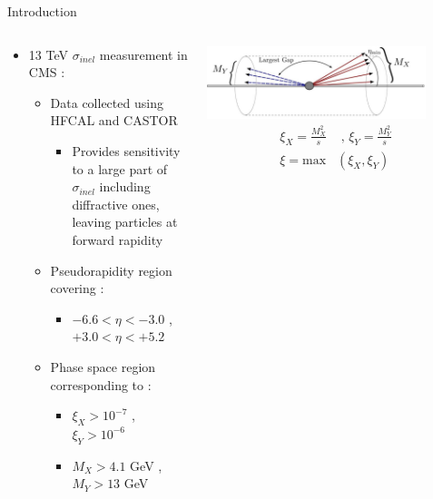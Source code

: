 \documentclass[aspectratio=169,xcolor=dvipsnames]{beamer}
\begin{document}
\begin{frame}{Introduction}
	\begin{columns}[T]
		\begin{column}{0.6\textwidth}
			\begin{itemize}
				\item 13 TeV $\sigma_{inel}$ measurement in CMS :
				\begin{itemize}
					\item Data collected using HFCAL and CASTOR
					\begin{itemize}
						\item Provides sensitivity to a large part of $\sigma_{inel}$ including diffractive ones, leaving particles at forward rapidity
					\end{itemize}
					\item Pseudorapidity region covering :
					\begin{itemize}
						\item $-6.6 < \eta < -3.0$ , $+3.0 < \eta < +5.2$
					\end{itemize}
					\item Phase space region corresponding to :
					\begin{itemize}
						\item $\xi_X > 10^{-7}$ , $\xi_Y > 10^{-6}$
						\item $M_X > 4.1$ GeV , $M_Y > 13$ GeV
					\end{itemize}
				\end{itemize}
			\end{itemize}
		\end{column}
		\begin{column}{.4\textwidth}
			\centering
			\includegraphics[width=0.85\textwidth]{system.png}
			\vspace{0.1in}
			\begin{align*}
			\xi_X = \frac{M^2_X}{s} &\text{ , } \xi_Y = \frac{M^2_Y}{s} \\
			\xi = \text{max}&(\xi_X , \xi_Y)
			\end{align*}
		\end{column}
	\end{columns}
	
\end{frame}
\end{document}
